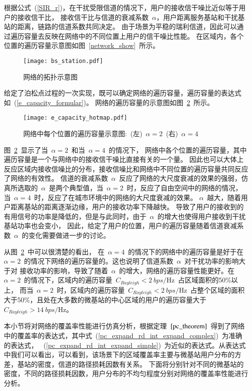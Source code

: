 根据公式~(\ref{SIR_r})，在干扰受限信道的情况下，用户的接收信干噪比近似等于用户的接收信干比，
接收信干比与信道的衰减系数~$\alpha$，用户距离服务基站和干扰基站的距离，链路的信道系数共同决定。
由于场景为平稳的瑞利信道，因此可以通过遍历容量去反映在网络中的不同位置上用户的信干噪比性能。
在区域内，各个位置的遍历容量示意图如图~\ref{network_show}~所示。
\begin{figure}[htbp]\label{network_show}
\centering
\texttt{[image: bs\_station.pdf]}
\caption{网络的拓扑示意图}\vspace{-0.5em}
\label{bs_dis}
\end{figure}
给定了泊松点过程的一次实现，既可以确定网络的遍历容量，遍历容量的表达式如~(\ref{e_capacity_formular})。
网络的遍历容量的示意图如图~\ref{e_capacity_show}~所示。
\begin{figure}[htbp]\label{network_show}
\centering
\texttt{[image: e\_capacity\_hotmap.pdf]}
\caption{网络中每个位置的遍历容量示意图:~(左)~$\alpha=2$~(右)~$\alpha=4$}\vspace{-0.5em}
\label{e_capacity_show}
\end{figure}
图~\ref{e_capacity_show}~显示了当~$\alpha=2$~和当~$\alpha=4$~的情况下，
网络中各个位置的遍历容量，其中遍历容量是一个与网络中的接收信干噪比直接有关的一个量。
因此也可以大体上反应区域内接收信噪比的分布，接收信噪比和网络中不同位置的遍历容量共同反应了网络的有效性。
信道的衰减系数~$\alpha$~反应了网络的大尺度衰减的效果的强弱，仿真所选取的~$\alpha$~是两个典型值，当~$\alpha=2$~时，反应了自由空间中的网络的情况，
当~$\alpha=4$~时，反应了在城市环境中的网络的大尺度衰减的效果。
$\alpha$~越大，随着用户距离基站的距离逐渐边缘，用户的接收功率下降越快。
导致了用户的接收到的有用信号的功率是降低的，但是与此同时，由于~$\alpha$~的增大也使得用户接收到干扰基站功率也会变小，
因此，给定了用户的位置，用户的遍历容量随着信道衰减系数~$\alpha$~的变化需要做进一步的讨论。

从图~\ref{e_capacity_show}~中可以很清楚的看出，
在~$\alpha=4$~的情况下的网络中的遍历容量是好于在~$\alpha=2$~的情况下网络的遍历容量的。这也说明了信道系数~$\alpha$~对干扰功率的影响大于对
接收功率的影响，导致了随着~$\alpha$~的增大，网络的遍历容量性能更好。在~$\alpha = 2$~的情况下，区域内的遍历容量~$C_{Rayleigh}<2~bps/\mathrm{Hz}$~占区域面积的50\%以上，
而当~$\alpha = 2$~时，区域内的遍历容量~$C_{Rayleigh}<2~bps/\mathrm{Hz}$~占整个区域的面积大于50\%，且处在大多数的微基站的中心区域的用户的遍历容量大于~$C_{Rayleigh} > 14~bps/\mathrm{Hz}$。

本小节将对网络的覆盖率性能进行仿真分析，根据定理~$\ref{pc_theorem}$~得到了网络中的覆盖率的表达式，其中式~(\ref{pc_expand_rd_int_expand_complex})~为准确的表达式，
~(\ref{pc_expand_rd_int_expand_simple})~为近似的表达式。从表达式中我们可以看出，可以看到，该场景下的区域覆盖率主要与微基站用户分布的方差，基站的密度，信道的路径损耗因数有关系。
下面将分别针对不同的微基站的密度，不同的路径损耗因数，用户分布的不均匀程度分别对网络的覆盖率性能进行分析。

